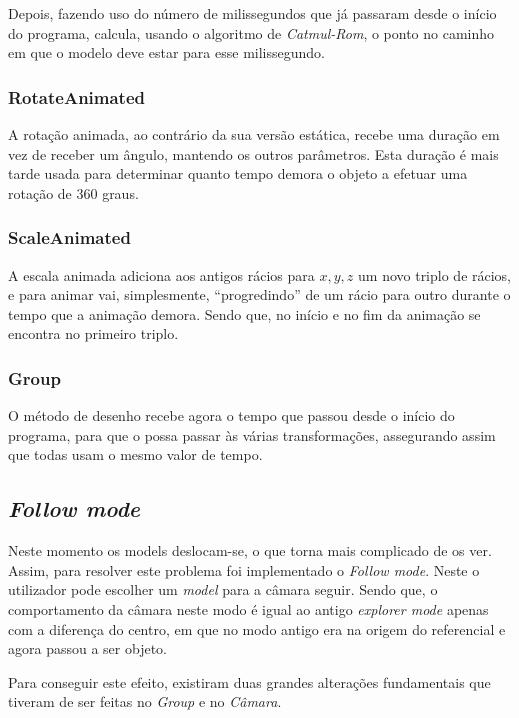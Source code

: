 \documentclass[a4paper]{article}
\begin{document}
Depois, fazendo uso do número de milissegundos que já passaram desde o início do programa, calcula, usando o algoritmo de \textit{Catmul-Rom}, o ponto no caminho em que o modelo deve estar para esse milissegundo.

\subsubsection{RotateAnimated}\label{sec:rotate}

A rotação animada, ao contrário da sua versão estática, recebe uma duração em vez de receber um ângulo, mantendo os outros parâmetros. Esta duração é mais tarde usada para determinar quanto tempo demora o objeto a efetuar uma rotação de 360\degree{} graus.

\subsubsection{ScaleAnimated}\label{sec:scale}

A escala animada adiciona aos antigos rácios para $x, y, z$ um novo triplo de rácios, e para animar vai, simplesmente, ``progredindo'' de um rácio para outro durante o tempo que a animação demora. Sendo que, no início e no fim da animação se encontra no primeiro triplo.

\subsubsection{Group}

O método de desenho recebe agora o tempo que passou desde o início do programa, para que o possa passar às várias transformações, assegurando assim que todas usam o mesmo valor de tempo.

\subsection{\textit{Follow mode}}

Neste momento os models deslocam-se, o que torna mais complicado de os ver. Assim, para resolver este problema
foi implementado o \textit{Follow mode}. Neste o utilizador pode escolher um \textit{model}
para a câmara seguir. Sendo que, o comportamento da câmara neste modo é igual ao antigo
\textit{explorer mode} apenas com a diferença do centro, em que no modo antigo era na origem do referencial e agora passou a ser objeto.

Para conseguir este efeito, existiram duas grandes alterações fundamentais que tiveram de ser feitas no \textit{Group} e no
\textit{Câmara}.
\end{document}
